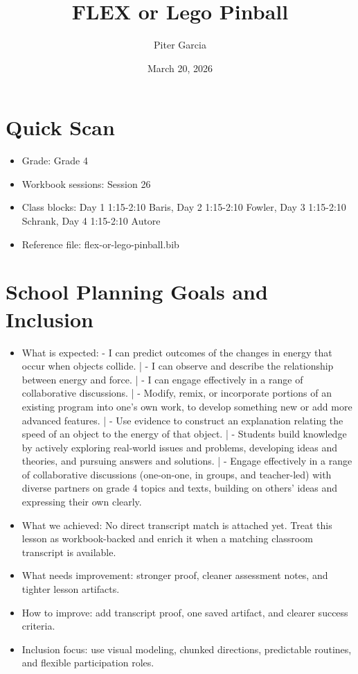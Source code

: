 \documentclass[11pt]{article}
\title{FLEX or Lego Pinball}
\author{Piter Garcia}
\date{March 20, 2026}
\begin{document}
    \maketitle
    \section*{Quick Scan}
    \begin{itemize}[leftmargin=*]
    \item Grade: Grade 4
    \item Workbook sessions: Session 26
    \item Class blocks: Day 1 1:15-2:10 Baris, Day 2 1:15-2:10 Fowler, Day 3 1:15-2:10 Schrank, Day 4 1:15-2:10 Autore
    \item Reference file: flex-or-lego-pinball.bib
    \end{itemize}
    \section*{School Planning Goals and Inclusion}
    \begin{itemize}[leftmargin=*]
    \item What is expected: - I can predict outcomes of the changes in energy that occur when objects collide. | - I can observe and describe the relationship between energy and force. | - I can engage effectively in a range of collaborative discussions. | - Modify, remix, or incorporate portions of an existing program into one's own work, to develop something new or add more advanced features. | - Use evidence to construct an explanation relating the speed of an object to the energy of that object. | - Students build knowledge by actively exploring real-world issues and problems, developing ideas and theories, and pursuing answers and solutions. | - Engage effectively in a range of collaborative discussions (one-on-one, in groups, and teacher-led) with diverse partners on grade 4 topics and texts, building on others’ ideas and expressing their own clearly.
    \item What we achieved: No direct transcript match is attached yet. Treat this lesson as workbook-backed and enrich it when a matching classroom transcript is available.
    \item What needs improvement: stronger proof, cleaner assessment notes, and tighter lesson artifacts.
    \item How to improve: add transcript proof, one saved artifact, and clearer success criteria.
    \item Inclusion focus: use visual modeling, chunked directions, predictable routines, and flexible participation roles.
    \end{itemize}
\end{document}
